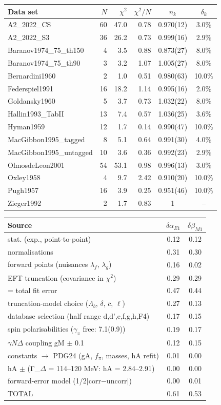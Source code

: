 \begin{tabular}{lrrrcc}
\hline
Data set & $N$ & $\chi^2$ & $\chi^2/N$ & $n_k$ & $\delta_k$ \\
\hline
A2\_2022\_CS & 60 & 47.0 & 0.78 & 0.970(12) & 3.0\% \\
A2\_2022\_S3 & 36 & 26.2 & 0.73 & 0.999(16) & 2.9\% \\
Baranov1974\_75\_th150 & 4 & 3.5 & 0.88 & 0.873(27) & 8.0\% \\
Baranov1974\_75\_th90 & 3 & 3.2 & 1.07 & 1.005(27) & 8.0\% \\
Bernardini1960 & 2 & 1.0 & 0.51 & 0.980(63) & 10.0\% \\
Federspiel1991 & 16 & 18.2 & 1.14 & 0.995(16) & 2.0\% \\
Goldansky1960 & 5 & 3.7 & 0.73 & 1.032(22) & 8.0\% \\
Hallin1993\_TabII & 13 & 7.4 & 0.57 & 1.036(25) & 3.6\% \\
Hyman1959 & 12 & 1.7 & 0.14 & 0.990(47) & 10.0\% \\
MacGibbon1995\_tagged & 8 & 5.1 & 0.64 & 0.991(30) & 4.0\% \\
MacGibbon1995\_untagged & 10 & 3.6 & 0.36 & 0.992(23) & 2.9\% \\
OlmosdeLeon2001 & 54 & 53.1 & 0.98 & 0.996(13) & 3.0\% \\
Oxley1958 & 4 & 9.7 & 2.42 & 0.910(20) & 10.0\% \\
Pugh1957 & 16 & 3.9 & 0.25 & 0.951(46) & 10.0\% \\
Zieger1992 & 2 & 1.7 & 0.83 & 1 & -- \\
\hline
\end{tabular}

\begin{tabular}{lcc}
\hline
Source & $\delta\alpha_{E1}$ & $\delta\beta_{M1}$ \\
\hline
stat. (exp., point-to-point) & 0.12 & 0.12 \\
normalisations & 0.31 & 0.30 \\
forward points (nuisances $\lambda_f$, $\lambda_g$) & 0.16 & 0.02 \\
EFT truncation (covariance in $\chi^2$) & 0.29 & 0.29 \\
= total fit error & 0.47 & 0.44 \\
truncation-model choice ($\Lambda_b$, $\delta$, $\bar c$, $\ell$) & 0.27 & 0.13 \\
database selection (half range d,d',e,f,g,h,F4) & 0.17 & 0.15 \\
spin polarisabilities ($\gamma_\pi$ free: 7.1(0.9)) & 0.19 & 0.17 \\
$\gamma N\Delta$ coupling gM $\pm$ 0.1 & 0.12 & 0.15 \\
constants $\to$ PDG24 (gA, $f_\pi$, masses, hA refit) & 0.01 & 0.00 \\
hA $\pm$ (Γ\_$\Delta$ = 114–120 MeV: hA = 2.84–2.91) & 0.00 & 0.00 \\
forward-error model (1/2$|$corr$-$uncorr$|$) & 0.00 & 0.01 \\
TOTAL & 0.61 & 0.53 \\
\hline
\end{tabular}

